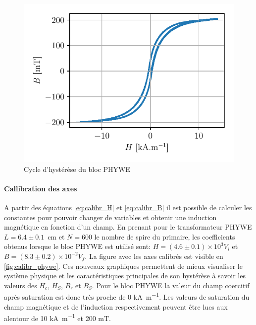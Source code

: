 \begin{minipage}{\linewidth}
    \begin{figure}
        \includegraphics[width=\linewidth]{figures/G1-phywe-avec-bloc_chang.pdf}
        \caption{Cycle d'hystérèse du bloc PHYWE}
        \label{fig:calibr_phywe}
    \end{figure}

    \paragraph{Callibration des axes}
    A partir des équations \autoref{eq:calibr_H} et \autoref{eq:calibr_B} il est possible de calculer les constantes pour pouvoir changer de variables et obtenir une induction magnétique en fonction d'un champ. En prenant pour le transformateur PHYWE \hbox{\(L = 6.4 \pm 0.1\) \si{\centi \meter}} et \(N = 600\) le nombre de spire du primaire, les coefficients obtenus lorsque le bloc PHYWE est utilisé sont: \hbox{\(H = (4.6\pm0.1)\times10^3 V_i\)} et \hbox{\(B = (8.3\pm0.2)\times10^{-2} V_f\)}. La figure avec les axes calibrés est visible en \autoref{fig:calibr_phywe}.
    Ces nouveaux graphiques permettent de mieux visualiser le système physique et les caractéristiques principales de son hystérèse à savoir les valeurs des \(H_c\), \(H_S\), \(B_r\) et \(B_S\). Pour le bloc PHYWE la valeur du champ coercitif après saturation est donc très proche de 0 \si{\kilo\ampere\per\meter}. Les valeurs de saturation  du champ magnétique et de l'induction respectivement peuvent être lues aux alentour de 10 \si{\kilo\ampere\per\meter} et 200 \si{\milli\tesla}.
\end{minipage}




